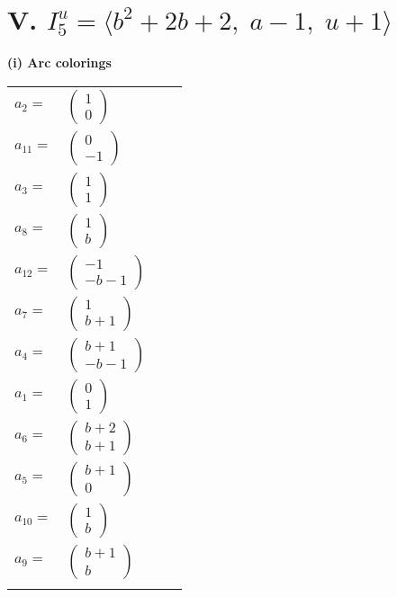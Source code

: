 \documentclass[1p]{elsarticle_modified}
\theoremstyle{definition}
\begin{document}
\centering \section*{V. $I^u_{5}= \langle b^2+2 b+2,\;a-1,\;u+1 \rangle$}
\flushleft \textbf{(i) Arc colorings}\\
\begin{tabular}{m{7pt} m{180pt} m{7pt} m{180pt} }
\flushright $a_{2}=$&$\begin{pmatrix}1\\0\end{pmatrix}$ \\
\flushright $a_{11}=$&$\begin{pmatrix}0\\-1\end{pmatrix}$ \\
\flushright $a_{3}=$&$\begin{pmatrix}1\\1\end{pmatrix}$ \\
\flushright $a_{8}=$&$\begin{pmatrix}1\\b\end{pmatrix}$ \\
\flushright $a_{12}=$&$\begin{pmatrix}-1\\- b-1\end{pmatrix}$ \\
\flushright $a_{7}=$&$\begin{pmatrix}1\\b+1\end{pmatrix}$ \\
\flushright $a_{4}=$&$\begin{pmatrix}b+1\\- b-1\end{pmatrix}$ \\
\flushright $a_{1}=$&$\begin{pmatrix}0\\1\end{pmatrix}$ \\
\flushright $a_{6}=$&$\begin{pmatrix}b+2\\b+1\end{pmatrix}$ \\
\flushright $a_{5}=$&$\begin{pmatrix}b+1\\0\end{pmatrix}$ \\
\flushright $a_{10}=$&$\begin{pmatrix}1\\b\end{pmatrix}$ \\
\flushright $a_{9}=$&$\begin{pmatrix}b+1\\b\end{pmatrix}$\\&\end{tabular}
\end{document}

